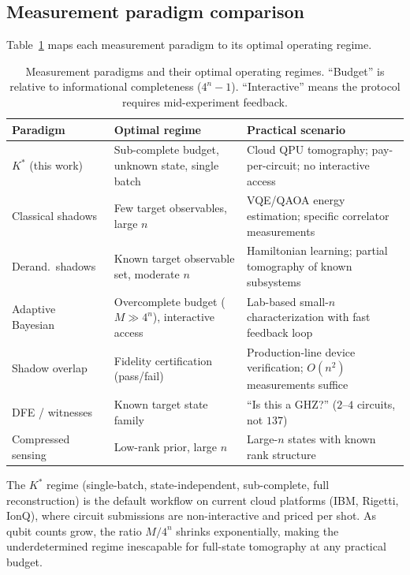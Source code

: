\documentclass[twocolumn,prx,aps,superscriptaddress,longbibliography]{revtex4-2}
\begin{document}
\subsection{Measurement paradigm comparison}
\label{sec:paradigm-table}

Table~\ref{tab:regimes-sm} maps each measurement paradigm to its
optimal operating regime.

\begin{table}[tb]
\centering
\caption{Measurement paradigms and their optimal operating regimes.
``Budget'' is relative to informational completeness ($4^n - 1$).
``Interactive'' means the protocol requires mid-experiment feedback.}
\label{tab:regimes-sm}
\begin{tabular}{p{2.0cm}p{2.4cm}p{3.2cm}}
\toprule
Paradigm & Optimal regime & Practical scenario \\
\midrule
$K^*$ (this work) &
  Sub-complete budget, unknown state, single batch &
  Cloud QPU tomography; pay-per-circuit; no interactive access \\[4pt]
Classical shadows~\cite{Huang2020} &
  Few target observables, large $n$ &
  VQE/QAOA energy estimation; specific correlator measurements \\[4pt]
Derand.\ shadows~\cite{Huang2021} &
  Known target observable set, moderate $n$ &
  Hamiltonian learning; partial tomography of known subsystems \\[4pt]
Adaptive Bayesian~\cite{Huszar2012} &
  Overcomplete budget ($M \gg 4^n$), interactive access &
  Lab-based small-$n$ characterization with fast feedback loop \\[4pt]
Shadow overlap &
  Fidelity certification (pass/fail) &
  Production-line device verification; $O(n^2)$ measurements suffice \\[4pt]
DFE / witnesses &
  Known target state family &
  ``Is this a GHZ?'' ($2$--$4$ circuits, not $137$) \\[4pt]
Compressed sensing &
  Low-rank prior, large $n$ &
  Large-$n$ states with known rank structure \\
\bottomrule
\end{tabular}
\end{table}

The $K^*$ regime (single-batch, state-independent, sub-complete,
full reconstruction) is the default workflow on current cloud
platforms (IBM, Rigetti, IonQ), where circuit submissions are
non-interactive and priced per shot.  As qubit counts grow, the
ratio $M/4^n$ shrinks exponentially, making the underdetermined
regime inescapable for full-state tomography at any practical budget.
\end{document}

